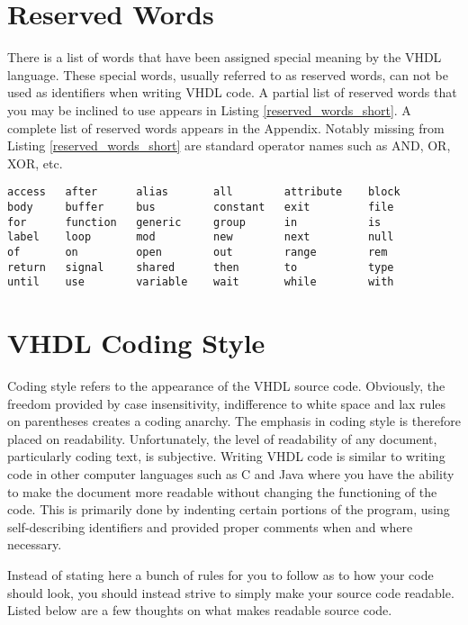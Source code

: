 \section{Reserved Words}
There is a list of words that have been assigned special meaning by the VHDL language. These special words, usually referred to as reserved words, can not be used as identifiers when writing VHDL code. A partial list of reserved words that you may be inclined to use appears in Listing \ref{reserved_words_short}. A complete list of reserved words appears in the Appendix. Notably missing from Listing \ref{reserved_words_short} are standard operator names such as AND, OR, XOR, etc.

\begin{lstlisting}[label=reserved_words_short, caption=A short list of VHDL reserved words.]
access   after      alias       all        attribute    block
body     buffer     bus         constant   exit         file
for      function   generic     group      in           is
label    loop       mod         new        next         null
of       on         open        out        range        rem
return   signal     shared      then       to           type
until    use        variable    wait       while        with
\end{lstlisting}

\section{VHDL Coding Style}
Coding style refers to the appearance of the VHDL source code. Obviously, the freedom provided by case insensitivity, indifference to white space and lax rules on parentheses creates a coding anarchy. The emphasis in coding style is therefore placed on readability. Unfortunately, the level of readability of any document, particularly coding text, is subjective. Writing VHDL code is similar to writing code in other computer languages such as C and Java where you have the ability to make the document more readable without changing the functioning of the code. This is primarily done by indenting certain portions of the program, using self-describing identifiers and provided proper comments when and where necessary.

Instead of stating here a bunch of rules for you to follow as to how your code should look, you should instead strive to simply make your source code readable. Listed below are a few thoughts on what makes readable source code.


